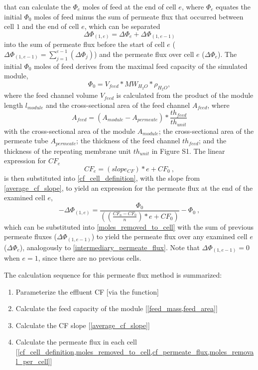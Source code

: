 that can calculate the $\Phi_e$ moles of feed at the end of cell $e$, where $\Phi_e$ equates the initial $\Phi_0$ moles of feed minus the sum of permeate flux that occurred between cell $1$ and the end of cell $e$, which can be separated
\begin{equation} \label{moles_removed_to_cell}
    \Delta \Phi_{(1,e)}=\Delta \Phi_{e}+\Delta \Phi_{(1,e-1)}
\end{equation}
into the sum of permeate flux before the start of cell $e$ ($\Delta \Phi_{(1,e-1)}=\sum_{j=1}^{e-1}(\Delta \Phi_{j})$) and the permeate flux over cell $e$ ($\Delta \Phi_{e}$). The initial $\Phi_0$ moles of feed derives from the maximal feed capacity of the simulated module,
\begin{equation} \label{feed_mass}
    \Phi_0=V_{feed}*MW_{H_2O}*\rho_{H_2O},
\end{equation}
where the feed channel volume $V_{feed}$ is calculated from the product of the module length $l_{module}$ and the cross-sectional area of the feed channel $A_{feed}$, where
\begin{equation} \label{feed_area}
    A_{feed}=(A_{module}-A_{permeate})*\frac{th_{feed}}{th_{unit}}
\end{equation}
with the cross-sectional area of the module $A_{module}$; the cross-sectional area of the permeate tube $A_{permeate}$; the thickness of the feed channel $th_{feed}$; and the thickness of the repeating membrane unit $th_{unit}$ in Figure S1. The linear expression for $CF_e$ 
\begin{equation} \label{cf_permeate_flux}
    CF_e=(slope_{CF})*e+CF_{0}~,
\end{equation}
is then substituted into \cref{cf_cell_definition}, with the slope from \cref{average_cf_slope}, to yield an expression for the permeate flux at the end of the examined cell $e$,
\begin{equation} \label{moles_removal_per_cell} 
    -\Delta \Phi_{(1,e)}=\frac{\Phi_0}{((\frac{CF_{n}-CF_{0}}{n})*e+CF_{0})}-\Phi_0~,
\end{equation}
which can be substituted into \cref{moles_removed_to_cell} with the sum of previous permeate fluxes ($\Delta \Phi_{(1,e-1)}$) to yield the permeate flux over any examined cell $e$ ($\Delta \Phi_{e}$), analogously to \cref{intermediary_permeate_flux}. Note that $\Delta \Phi_{(1,e-1)}=0$ when $e=1$, since there are no previous cells. 

The calculation sequence for this permeate flux method is summarized:
\begin{enumerate}
    \item Parameterize the effluent CF [via the  function]
    \item Calculate the feed capacity of the module [\cref{feed_mass,feed_area}]
    \item Calculate the CF slope [\cref{average_cf_slope}]
    \item Calculate the permeate flux in each cell [\cref{cf_cell_definition,moles_removed_to_cell,cf_permeate_flux,moles_removal_per_cell}]
\end{enumerate}


